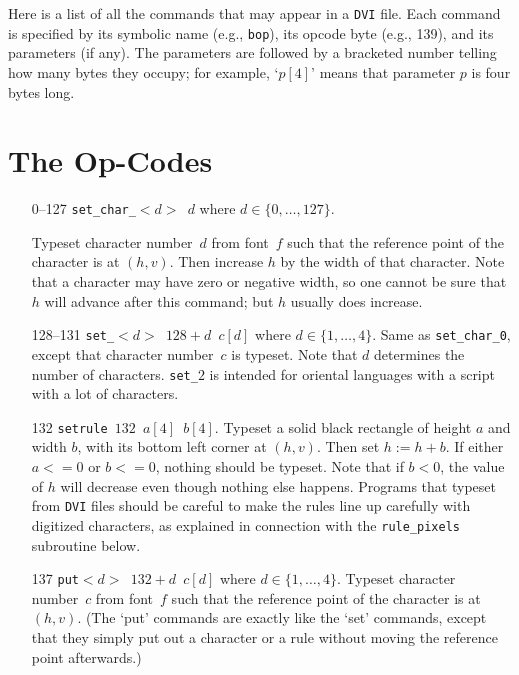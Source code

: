 \documentclass[10pt, a4paper]{article}
\begin{document}
Here is a list of all the commands that may appear in a \texttt{DVI} file. 
Each command is specified by its symbolic name (e.g., \texttt{bop}), 
its opcode byte (e.g., 139), and its parameters (if any). 
The parameters are followed by a bracketed number 
telling how many bytes they occupy; for example,
`$p[4]$' means that parameter $p$ is four bytes long. 

\section{The Op-Codes}\label{sec:opCodes}

\begin{itemize}

\item[0--127] \texttt{set\_char\_$<d>$ $d$} where $d\in\{0,\dots,127\}$. 

Typeset character number~$d$ from font~$f$ 
such that the reference point of the character is at $(h,v)$. 
Then increase $h$ by the width of that character. 
Note that a character may have zero or negative width, 
so one cannot be sure that $h$ will advance after this command; 
but $h$ usually does increase.

\item[128--131] \texttt{set\_$<d>$ $128+d$ $c[d]$} where $d\in\{1,\dots,4\}$. 
Same as \texttt{set\_char\_0}, except that character number~$c$ is typeset. 
Note that $d$ determines the number of characters. 
\texttt{set\_$2$} is intended for oriental languages 
with a script with a lot of characters. 


\item[132] \texttt{setrule $132$ $a[4]$ $b[4]$}. 
Typeset a solid black rectangle of height $a$ and width $b$, 
with its bottom left corner at $(h,v)$. 
Then set $h:=h+b$. If either $a<=0$ or $b<=0$, nothing should be typeset. 
Note that if $b<0$, the value of $h$ will decrease 
even though nothing else happens. 
Programs that typeset from \texttt{DVI} files 
should be careful to make the rules line up carefully 
with digitized characters, 
as explained in connection with the \texttt{rule\_pixels} subroutine below.

\item[137] \texttt{put$<d>$ $132+d$ $c[d]$} where $d\in\{1,\dots,4\}$. 
Typeset character number~$c$ from font~$f$
such that the reference point of the character is at $(h,v)$. 
(The `put' commands are exactly like the `set' commands, 
except that they simply put out a character or a rule 
without moving the reference point afterwards.)



\end{itemize}
\end{document}
